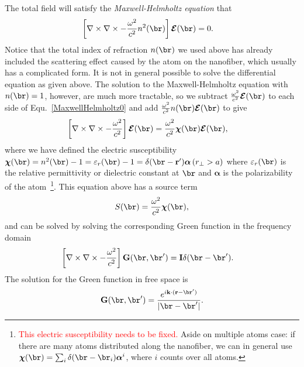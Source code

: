 \documentclass[]{report}
\begin{document}
The total field will satisfy the \textit{Maxwell-Helmholtz equation} that
\begin{align}
\left[ \nabla\times\nabla\times-\frac{\omega^2}{c^2}n^2(\br) \right] \boldsymbol{\mathcal{E}}(\br) &=0. \label{MaxwellHelmholtz0}
\end{align}
Notice that the total index of refraction $ n(\br) $ we used above has already included the scattering effect caused by the atom on the nanofiber, which usually has a complicated form. It is not in general possible to solve the differential equation as given above. The solution to the Maxwell-Helmholtz equation with $ n(\br)=1 $, however, are much more tractable, so we subtract $ \frac{\omega^2}{c^2} \boldsymbol{\mathcal{E}}(\br)$ to each side of Equ.~\ref{MaxwellHelmholtz0} and add $ \frac{\omega^2}{c^2}n(\br) \boldsymbol{\mathcal{E}}(\br) $ to give
\begin{align}
\left[ \nabla\times\nabla\times - \frac{\omega^2}{c^2} \right] \boldsymbol{\mathcal{E}}(\br) &= \frac{\omega^2}{c^2} \boldsymbol{\chi}(\br) \boldsymbol{\mathcal{E}}(\br),
\end{align}
where we have defined the electric susceptibility $ \boldsymbol{\chi}(\br)=n^2(\br)-1=\varepsilon_r(\br)-1 = \delta(\br-\mathbf{r}')\boldsymbol{\alpha} \, (r_\perp>a)$ where $ \varepsilon_r(\br) $ is the relative permittivity or dielectric constant at $ \br $ and $ \boldsymbol{\alpha} $ is the polarizability of the atom~\footnote{\textcolor{red}{This electric susceptibility needs to be fixed.} Aside on multiple atoms case: if there are many atoms distributed along the nanofiber, we can in general use 
$\boldsymbol{\chi}(\br)=\sum_i \delta(\br-\br_{i})\boldsymbol{\alpha}^i$,
where $ i $ counts over all atoms.}. This equation above has a source term 
\begin{align}
S(\br)=\frac{\omega^2}{c^2} \boldsymbol{\chi}(\br),%
\end{align}
and can be solved by solving the corresponding Green function in the frequency domain
\begin{align}
\left[ \nabla\times\nabla\times - \frac{\omega^2}{c^2} \right] \mathbf{G}(\br,\br') &= \mathbf{I}\delta(\br-\br').
\end{align}
The solution for the Green function in free space is 
\begin{align}
\mathbf{G}(\br,\br') =\frac{e^{i\mathbf{k}\cdot (\mathbf{r}-\br')}}{|\br-\br'|}.
\end{align}
\end{document}
